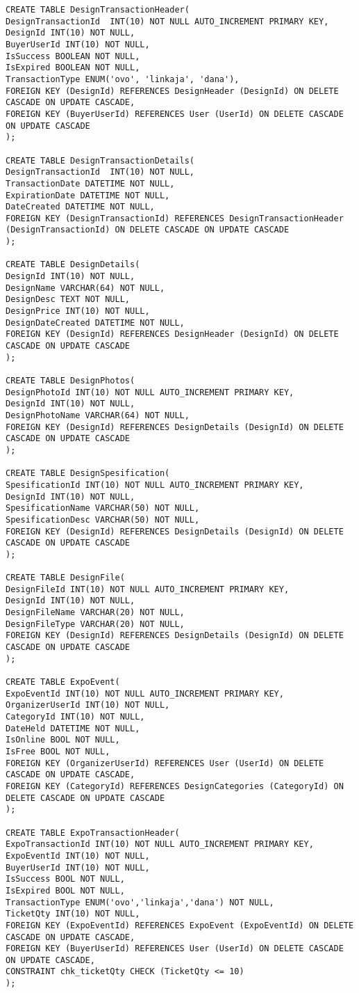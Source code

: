 \begin{lstlisting}
CREATE TABLE DesignTransactionHeader(
DesignTransactionId  INT(10) NOT NULL AUTO_INCREMENT PRIMARY KEY,
DesignId INT(10) NOT NULL,
BuyerUserId INT(10) NOT NULL,
IsSuccess BOOLEAN NOT NULL,
IsExpired BOOLEAN NOT NULL,
TransactionType ENUM('ovo', 'linkaja', 'dana'),
FOREIGN KEY (DesignId) REFERENCES DesignHeader (DesignId) ON DELETE CASCADE ON UPDATE CASCADE,
FOREIGN KEY (BuyerUserId) REFERENCES User (UserId) ON DELETE CASCADE ON UPDATE CASCADE
);

CREATE TABLE DesignTransactionDetails(
DesignTransactionId  INT(10) NOT NULL,
TransactionDate DATETIME NOT NULL,
ExpirationDate DATETIME NOT NULL,
DateCreated DATETIME NOT NULL,
FOREIGN KEY (DesignTransactionId) REFERENCES DesignTransactionHeader (DesignTransactionId) ON DELETE CASCADE ON UPDATE CASCADE
);

CREATE TABLE DesignDetails(
DesignId INT(10) NOT NULL,
DesignName VARCHAR(64) NOT NULL,
DesignDesc TEXT NOT NULL,
DesignPrice INT(10) NOT NULL,
DesignDateCreated DATETIME NOT NULL,
FOREIGN KEY (DesignId) REFERENCES DesignHeader (DesignId) ON DELETE CASCADE ON UPDATE CASCADE
);

CREATE TABLE DesignPhotos(
DesignPhotoId INT(10) NOT NULL AUTO_INCREMENT PRIMARY KEY,
DesignId INT(10) NOT NULL,
DesignPhotoName VARCHAR(64) NOT NULL,
FOREIGN KEY (DesignId) REFERENCES DesignDetails (DesignId) ON DELETE CASCADE ON UPDATE CASCADE
);

CREATE TABLE DesignSpesification(
SpesificationId INT(10) NOT NULL AUTO_INCREMENT PRIMARY KEY,
DesignId INT(10) NOT NULL,
SpesificationName VARCHAR(50) NOT NULL,
SpesificationDesc VARCHAR(50) NOT NULL,
FOREIGN KEY (DesignId) REFERENCES DesignDetails (DesignId) ON DELETE CASCADE ON UPDATE CASCADE
);

CREATE TABLE DesignFile(
DesignFileId INT(10) NOT NULL AUTO_INCREMENT PRIMARY KEY,
DesignId INT(10) NOT NULL,
DesignFileName VARCHAR(20) NOT NULL,
DesignFileType VARCHAR(20) NOT NULL,
FOREIGN KEY (DesignId) REFERENCES DesignDetails (DesignId) ON DELETE CASCADE ON UPDATE CASCADE
);

CREATE TABLE ExpoEvent(
ExpoEventId INT(10) NOT NULL AUTO_INCREMENT PRIMARY KEY,
OrganizerUserId INT(10) NOT NULL,
CategoryId INT(10) NOT NULL,
DateHeld DATETIME NOT NULL,
IsOnline BOOL NOT NULL,
IsFree BOOL NOT NULL,
FOREIGN KEY (OrganizerUserId) REFERENCES User (UserId) ON DELETE CASCADE ON UPDATE CASCADE,
FOREIGN KEY (CategoryId) REFERENCES DesignCategories (CategoryId) ON DELETE CASCADE ON UPDATE CASCADE
);

CREATE TABLE ExpoTransactionHeader(
ExpoTransactionId INT(10) NOT NULL AUTO_INCREMENT PRIMARY KEY,
ExpoEventId INT(10) NOT NULL,   
BuyerUserId INT(10) NOT NULL,
IsSuccess BOOL NOT NULL,
IsExpired BOOL NOT NULL,
TransactionType ENUM('ovo','linkaja','dana') NOT NULL,
TicketQty INT(10) NOT NULL,
FOREIGN KEY (ExpoEventId) REFERENCES ExpoEvent (ExpoEventId) ON DELETE CASCADE ON UPDATE CASCADE,
FOREIGN KEY (BuyerUserId) REFERENCES User (UserId) ON DELETE CASCADE ON UPDATE CASCADE,
CONSTRAINT chk_ticketQty CHECK (TicketQty <= 10)
);


\end{lstlisting}
